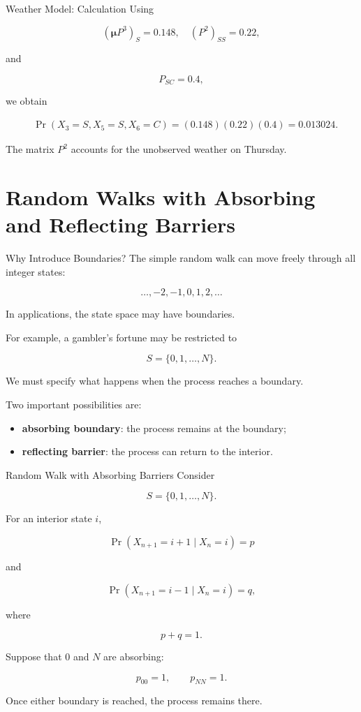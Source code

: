 \documentclass[
  ignorenonframetext,
  aspectratio=169,
]{beamer}
\providecommand{\tightlist}{%
  \setlength{\itemsep}{0pt}\setlength{\parskip}{0pt}}
\begin{document}
\begin{frame}{Weather Model: Calculation}
\protect{}\label{weather-model-calculation}
Using

\[
(\boldsymbol{\mu}P^3)_S=0.148, \quad (P^2)_{SS}=0.22,
\]

and

\[
P_{SC}=0.4,
\]

we obtain

\[
\begin{aligned}
&\Pr(X_3=S,X_5=S,X_6=C) =(0.148)(0.22)(0.4) =\boxed{0.013024}.
\end{aligned}
\]

The matrix \(P^2\) accounts for the unobserved weather on Thursday.
\end{frame}

\section{Random Walks with Absorbing and Reflecting
Barriers}\label{random-walks-with-absorbing-and-reflecting-barriers}

\begin{frame}{Why Introduce Boundaries?}
\protect{}\label{why-introduce-boundaries}
The simple random walk can move freely through all integer states:

\[
\ldots,-2,-1,0,1,2,\ldots
\]

In applications, the state space may have boundaries.

For example, a gambler's fortune may be restricted to

\[
S=\{0,1,\ldots,N\}.
\]

We must specify what happens when the process reaches a boundary.

Two important possibilities are:

\begin{itemize}
\tightlist
\item
  \textbf{absorbing boundary}: the process remains at the boundary;
\item
  \textbf{reflecting barrier}: the process can return to the interior.
\end{itemize}
\end{frame}

\begin{frame}{Random Walk with Absorbing Barriers}
\protect{}\label{random-walk-with-absorbing-barriers}
Consider

\[
S=\{0,1,\ldots,N\}.
\]

For an interior state \(i\),

\[
\Pr(X_{n+1}=i+1\mid X_n=i)=p
\]

and

\[
\Pr(X_{n+1}=i-1\mid X_n=i)=q,
\]

where

\[
p+q=1.
\]

Suppose that \(0\) and \(N\) are absorbing:

\[
p_{00}=1,
\qquad
p_{NN}=1.
\]

Once either boundary is reached, the process remains there.
\end{frame}
\end{document}

